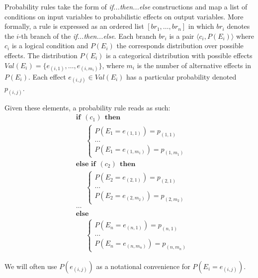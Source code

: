 Probability rules take the form of \textit{if...then...else} constructions and map a list of conditions on input variables to probabilistic effects on output variables. More formally, a rule is expressed as an ordered list $[ br_1, \dots, br_{n}]$ in which $br_i$ denotes the $i$-th branch of the \textit{if...then...else}. Each branch $br_i$ is a pair $\langle c_i, P(E_i) \rangle$ where $c_i$ is a logical condition and $P(E_i)$ the corresponds distribution over possible effects.  The distribution $P(E_i)$ is a categorical distribution with possible effects $\mathit{Val}(E_i) = \{e_{(i,1)}, \dots, e_{(i,m_i)}\}$, where $m_i$ is the number of alternative effects in $P(E_i)$.  Each effect $e_{(i,j)} \in \mathit{Val}(E_i)$ has a particular probability denoted $p_{(i,j)}$. 

Given these elements, a probability rule reads as such:
\begin{equation}
\begin{aligned}
& \textbf{if} \ \ (c_{1}) \ \ \textbf{then} \\ 
& \;\;\;\;\; \begin{cases}
P(E_1\!=\!e_{(1,1)}) = p_{(1,1)} \\
 \dots \\
P(E_1\!=\!e_{(1,m_1)}) = p_{(1,m_1)} 
\end{cases} \\[3mm]
& \textbf{else if} \ \ (c_{2}) \ \ \textbf{then} \\ 
& \;\;\;\;\; \begin{cases}
P(E_2\!=\!e_{(2,1)}) = p_{(2,1)} \\
 \dots \\
P(E_2\!=\!e_{(2,m_2)}) = p_{(2,m_2)}
\end{cases} \\ 
& \dots  \\
& \textbf{else} \\
& \;\;\;\;\; \begin{cases}
P(E_{n}\!=\!e_{(n,1)}) = p_{(n,1)} \\
\dots \\
P(E_{n}\!=\!e_{(n,m_n)}) = p_{(n,m_n)}
\end{cases}
\end{aligned}
\label{eq:probrule}
\end{equation}

We will often use $P(e_{(i,j)})$ as a notational convenience for $P(E_i = e_{(i,j)})$.   


